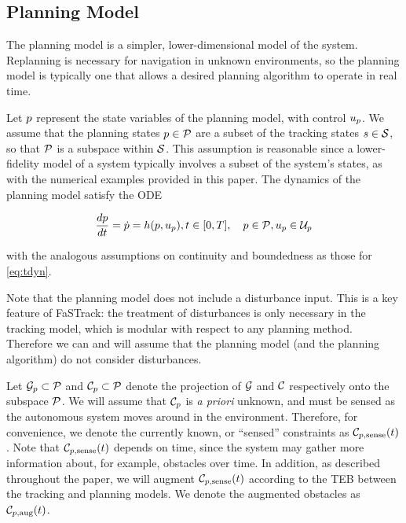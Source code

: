 \subsection{Planning Model \label{sec:planning_model}}
The planning model is a simpler, lower-dimensional model of the system.
Replanning is necessary for navigation in unknown environments, so the planning model is typically one that allows a desired planning algorithm to operate in real time.

Let $p$ represent the state variables of the planning model, with control $u_p$. 
We assume that the planning states $p \in \mathcal{P}$ are a subset of the tracking states $s \in \mathcal{S}$, so that $\mathcal{P}$ is a subspace within $\mathcal{S}$.
This assumption is reasonable since a lower-fidelity model of a system typically involves a subset of the system's states, as with the numerical examples provided in this paper.
The dynamics of the planning model satisfy the ODE

\begin{align}
\label{eq:pdyn}
\frac{d\pstate}{d\tvar} = \dot{\pstate} = \pdyn(\pstate, \pctrl), \tvar \in [0, \thor], \quad \pstate \in \pset, \pctrl \in \pcset
\end{align}

\noindent with the analogous assumptions on continuity and boundedness as those for \eqref{eq:tdyn}.

Note that the planning model does not include a disturbance input. 
This is a key feature of FaSTrack: the treatment of disturbances is only necessary in the tracking model, which is modular with respect to any planning method. Therefore we can and will assume that the planning model (and the planning algorithm) do not consider disturbances.

Let $\mathcal G_p \subset \mathcal{P}$ and $\mathcal C_p \subset \mathcal{P}$ denote the projection of $\mathcal G$ and $\mathcal C$ respectively onto the subspace $\mathcal{P}$.
We will assume that $\mathcal C_p$ is \textit{a priori} unknown, and must be sensed as the autonomous system moves around in the environment.
Therefore, for convenience, we denote the currently known, or ``sensed'' constraints as $\mathcal C_{p,\text{sense}}(t)$.
Note that $\mathcal C_{p,\text{sense}}(t)$ depends on time, since the system may gather more information about, for example, obstacles over time.
In addition, as described throughout the paper, we will augment $\mathcal C_{p,\text{sense}}(t)$ according to the TEB between the tracking and planning models.
We denote the augmented obstacles as $\mathcal C_{p,\text{aug}}(t)$.

